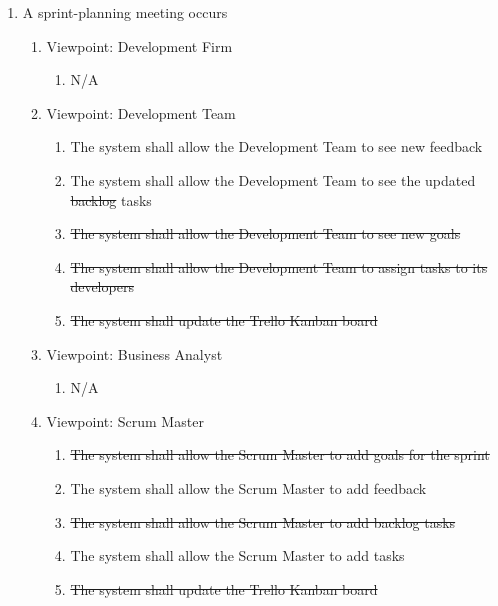 \documentclass[12pt, titlepage]{article}
\begin{document}
\begin{enumerate}[{BE}1.]
	\item A sprint-planning meeting occurs %
	\begin{enumerate}[{VP}1.] 
	    \item Viewpoint: Development Firm
	        \begin{enumerate}
	            \item[] N/A
	        \end{enumerate}
	    \item Viewpoint: Development Team
	        \begin{enumerate}
	            \item The system shall allow the Development Team to see new feedback
	            \item The system shall allow the Development Team to see the updated \sout{backlog} tasks
	            \item \sout{The system shall allow the Development Team to see new goals}
	            \item \sout{The system shall allow the Development Team to assign tasks to its developers}
	            \item \sout{The system shall update the Trello Kanban board}
	        \end{enumerate}
		\item Viewpoint: Business Analyst
			\begin{enumerate}
			    \item[] N/A
			\end{enumerate}
		\item Viewpoint: Scrum Master
			\begin{enumerate}
	            \item \sout{The system shall allow the Scrum Master to add goals for the sprint}
	            \item The system shall allow the Scrum Master to add feedback
	            \item \sout{The system shall allow the Scrum Master to add backlog tasks}
	            \item The system shall allow the Scrum Master to add tasks
	            \item \sout{The system shall update the Trello Kanban board}
			\end{enumerate}
	\end{enumerate}


\end{enumerate}
\end{document}
